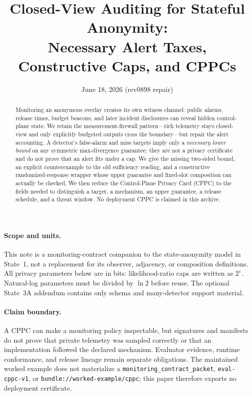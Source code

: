 \documentclass[11pt]{article}
\title{Closed-View Auditing for Stateful Anonymity:\\Necessary Alert Taxes, Constructive Caps, and CPPCs}
\author{}
\date{June 18, 2026 (rev0898 repair)}
\begin{document}
\maketitle

\begin{abstract}
Monitoring an anonymous overlay creates its own witness channel: public alarms, release times, budget beacons, and later incident disclosures can reveal hidden control-plane state.
We retain the measurement-firewall pattern---rich telemetry stays closed-view and only explicitly budgeted outputs cross the boundary---but repair the alert accounting.
A detector's false-alarm and miss targets imply only a \emph{necessary lower bound} on any symmetric max-divergence guarantee; they are not a privacy certificate and do not prove that an alert fits under a cap.
We give the missing two-sided bound, an explicit counterexample to the old sufficiency reading, and a constructive randomized-response wrapper whose upper guarantee and fixed-slot composition can actually be checked.
We then reduce the Control-Plane Privacy Card (CPPC) to the fields needed to distinguish a target, a mechanism, an upper guarantee, a release schedule, and a threat window.
No deployment CPPC is claimed in this archive.
\end{abstract}

\paragraph{Scope and units.}
This note is a monitoring-contract companion to the state-anonymity model in State~1, not a replacement for its observer, adjacency, or composition definitions.\cite{series:state1}
All privacy parameters below are in bits: likelihood-ratio caps are written as $2^\varepsilon$.
Natural-log parameters must be divided by $\ln 2$ before reuse.\cite{series:notation}
The optional State~3A addendum contains only schema and many-detector support material.\cite{series:state3addendum}

\paragraph{Claim boundary.}
A CPPC can make a monitoring policy inspectable, but signatures and manifests do not prove that private telemetry was sampled correctly or that an implementation followed the declared mechanism.
Evaluator evidence, runtime conformance, and release lineage remain separate obligations.\cite{series:evalnotary,series:opB,series:release}
The maintained worked example does not materialize a \texttt{monitoring\_contract\_packet}, \texttt{eval-cppc-v1}, or \texttt{bundle://worked-example/cppc}; this paper therefore exports no deployment certificate.\cite{series:workedexample}
\end{document}
